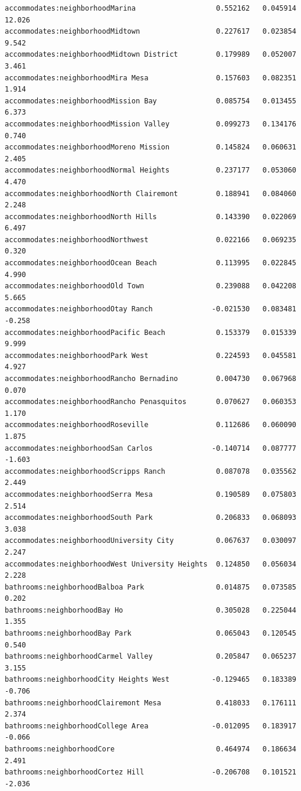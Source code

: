 \documentclass[
  letterpaper,
  DIV=11,
  numbers=noendperiod,
  oneside]{scrreprt}
\begin{document}
\begin{verbatim}
accommodates:neighborhoodMarina                   0.552162   0.045914  12.026
accommodates:neighborhoodMidtown                  0.227617   0.023854   9.542
accommodates:neighborhoodMidtown District         0.179989   0.052007   3.461
accommodates:neighborhoodMira Mesa                0.157603   0.082351   1.914
accommodates:neighborhoodMission Bay              0.085754   0.013455   6.373
accommodates:neighborhoodMission Valley           0.099273   0.134176   0.740
accommodates:neighborhoodMoreno Mission           0.145824   0.060631   2.405
accommodates:neighborhoodNormal Heights           0.237177   0.053060   4.470
accommodates:neighborhoodNorth Clairemont         0.188941   0.084060   2.248
accommodates:neighborhoodNorth Hills              0.143390   0.022069   6.497
accommodates:neighborhoodNorthwest                0.022166   0.069235   0.320
accommodates:neighborhoodOcean Beach              0.113995   0.022845   4.990
accommodates:neighborhoodOld Town                 0.239088   0.042208   5.665
accommodates:neighborhoodOtay Ranch              -0.021530   0.083481  -0.258
accommodates:neighborhoodPacific Beach            0.153379   0.015339   9.999
accommodates:neighborhoodPark West                0.224593   0.045581   4.927
accommodates:neighborhoodRancho Bernadino         0.004730   0.067968   0.070
accommodates:neighborhoodRancho Penasquitos       0.070627   0.060353   1.170
accommodates:neighborhoodRoseville                0.112686   0.060090   1.875
accommodates:neighborhoodSan Carlos              -0.140714   0.087777  -1.603
accommodates:neighborhoodScripps Ranch            0.087078   0.035562   2.449
accommodates:neighborhoodSerra Mesa               0.190589   0.075803   2.514
accommodates:neighborhoodSouth Park               0.206833   0.068093   3.038
accommodates:neighborhoodUniversity City          0.067637   0.030097   2.247
accommodates:neighborhoodWest University Heights  0.124850   0.056034   2.228
bathrooms:neighborhoodBalboa Park                 0.014875   0.073585   0.202
bathrooms:neighborhoodBay Ho                      0.305028   0.225044   1.355
bathrooms:neighborhoodBay Park                    0.065043   0.120545   0.540
bathrooms:neighborhoodCarmel Valley               0.205847   0.065237   3.155
bathrooms:neighborhoodCity Heights West          -0.129465   0.183389  -0.706
bathrooms:neighborhoodClairemont Mesa             0.418033   0.176111   2.374
bathrooms:neighborhoodCollege Area               -0.012095   0.183917  -0.066
bathrooms:neighborhoodCore                        0.464974   0.186634   2.491
bathrooms:neighborhoodCortez Hill                -0.206708   0.101521  -2.036

\end{verbatim}
\end{document}
